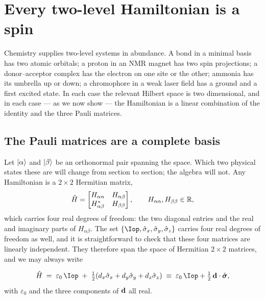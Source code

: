 \section{Every two-level Hamiltonian is a spin}
\label{sec:formalism}

Chemistry supplies two-level systems in abundance. A bond in a minimal basis has two
atomic orbitals; a proton in an NMR magnet has two spin projections; a donor--acceptor
complex has the electron on one site or the other; ammonia has its umbrella up or down;
a chromophore in a weak laser field has a ground and a first excited state. In each case
the relevant Hilbert space is two dimensional, and in each case --- as we now show ---
the Hamiltonian is a linear combination of the identity and the three Pauli matrices.

\subsection{The Pauli matrices are a complete basis}

Let $\ket{\alpha}$ and $\ket{\beta}$ be an orthonormal pair spanning the space. Which
two physical states these are will change from section to section; the algebra will not.
Any Hamiltonian is a $2\times2$ Hermitian matrix,
%
\begin{equation}
\hat{H} =
\begin{bmatrix}
H_{\alpha\alpha} & H_{\alpha\beta}\\
H_{\alpha\beta}^{*} & H_{\beta\beta}
\end{bmatrix},
\qquad H_{\alpha\alpha}, H_{\beta\beta}\in\mathbb{R},
\label{eq:generalH}
\end{equation}
%
which carries four real degrees of freedom: the two diagonal entries and the real and
imaginary parts of $H_{\alpha\beta}$. The set $\{\Iop,\sxo,\syo,\szo\}$ carries four
real degrees of freedom as well, and it is straightforward to check that these four
matrices are linearly independent. They therefore span the space of Hermitian
$2\times2$ matrices, and we may always write

\begin{keyresult}
\vspace{-0.35cm}
\begin{equation}
\Hop \;=\; \varepsilon_0\,\Iop \;+\; \half\!\left(d_x\sxo + d_y\syo + d_z\szo\right)
    \;\equiv\; \varepsilon_0\,\Iop + \half\,\dvec\cdot\pauliv ,
\label{eq:pauli-decomp}
\end{equation}
with $\varepsilon_0$ and the three components of $\mathbf{d}$ all real.
\end{keyresult}


